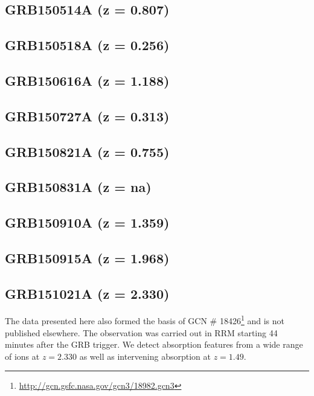 \documentclass{aa}    %
\begin{document}
\subsection{GRB150514A (z = 0.807)}	



\subsection{GRB150518A (z = 0.256)}	



\subsection{GRB150616A (z = 1.188)}	



\subsection{GRB150727A (z = 0.313)}	



\subsection{GRB150821A (z = 0.755)}	



\subsection{GRB150831A (z = na)}	



\subsection{GRB150910A (z = 1.359)}	



\subsection{GRB150915A (z = 1.968)}	



\subsection{GRB151021A (z = 2.330)}
The data presented here also formed the basis of GCN \#
18426\footnote{\url{http://gcn.gsfc.nasa.gov/gcn3/18982.gcn3}} and is not
published elsewhere. The observation was carried out in RRM starting 44 minutes
after the GRB trigger. We detect absorption features from a wide range of ions
at $z=2.330$ as well as intervening absorption at $z=1.49$.
\end{document}
